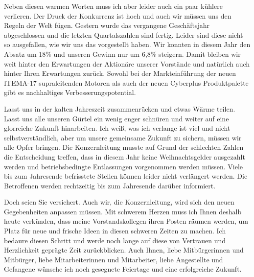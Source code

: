 Neben diesen warmen Worten muss ich aber leider auch ein paar kühlere
verlieren. Der Druck der Konkurrenz ist hoch und auch wir müssen uns den
Regeln der Welt fügen. Gestern wurde das vergangene Geschäftsjahr
abgeschlossen und die letzten Quartalszahlen sind fertig. Leider sind
diese nicht so ausgefallen, wie wir uns das vorgestellt haben.
Wir konnten in diesem Jahr den Absatz um 18\% und unseren
Gewinn nur um 6,8\% steigern. Damit bleiben wir weit hinter den
Erwartungen der Aktionäre unserer Vorstände und natürlich auch hinter
Ihren Erwartungen zurück.
Sowohl bei der Markteinführung der neuen ITEMA-17 supraleitenden Motoren
als auch der neuen Cyberplus Produktpalette gibt es nachhaltiges Verbesserungspotential.

Lasst uns in der kalten Jahreszeit zusammenrücken und etwas Wärme
teilen. Lasst uns alle unseren Gürtel ein wenig enger schnüren und weiter auf
eine glorreiche Zukunft hinarbeiten. Ich weiß, was ich verlange ist
viel und nicht selbstverständlich, aber um unsere gemeinsame Zukunft zu
sichern, müssen wir alle Opfer bringen. Die Konzernleitung musste auf
Grund der schlechten Zahlen die Entscheidung treffen, dass in diesem
Jahr keine Weihnachtsgelder ausgezahlt werden und betriebsbedingte Entlassungen 
vorgenommen werden müssen. Viele bis zum Jahresende befrisstete Stellen können leider nicht verlängert werden.
Die Betroffenen werden rechtzeitig bis zum Jahresende darüber informiert.

Doch seien Sie versichert. Auch wir, die Konzernleitung, wird sich den
neuen Gegebenheiten anpassen müssen.
Mit schwerem Herzen muss ich Ihnen deshalb heute verkünden, dass meine Vorstandskollegen ihren Posten räumen werden, um
Platz für neue und frische Ideen in diesen schweren Zeiten zu machen.
Ich bedaure diesen Schritt und werde noch lange auf diese von Vertrauen
und Herzlichkeit geprägte Zeit zurückblicken.
Auch Ihnen, liebe Mitbürgerinnen und Mitbürger, liebe Mitarbeiterinnen
und Mitarbeiter, liebe Angestellte und Gefangene wünsche ich noch
gesegnete Feiertage und eine erfolgreiche Zukunft.

\impressumStandalone

%
%


